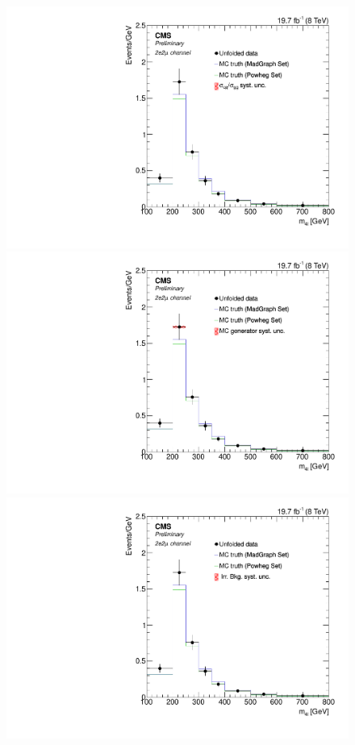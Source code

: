 \begin{figure}[hbtp]
  \begin{center}
    \includegraphics[width=0.8\cmsFigWidth]{Figures/Unfolding/Systematics/ZZTo2e2m_Mass_qqgg_Pow_fr}     
    \includegraphics[width=0.8\cmsFigWidth]{Figures/Unfolding/Systematics/ZZTo2e2m_Mass_MCgen_Pow_fr}     
    \includegraphics[width=0.8\cmsFigWidth]{Figures/Unfolding/Systematics/ZZTo2e2m_Mass_IrrBkg_Pow_fr}

\end{center}
\end{figure}

